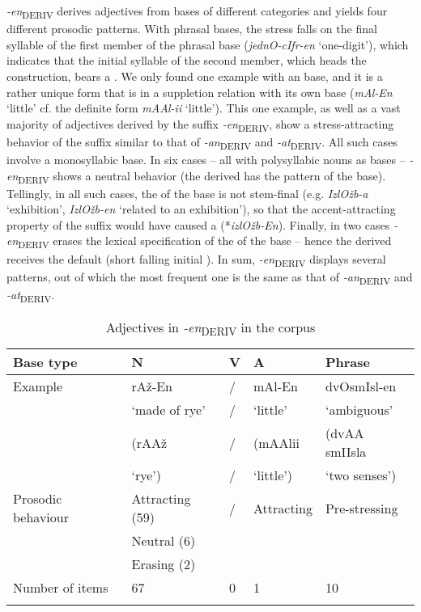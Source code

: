 \documentclass[output=paper, colorlinks, citecolor=brown, newtxmath]{langsci/langscibook}
\begin{document}
\textit{-en}\textsubscript{DERIV} derives adjectives from bases of different categories and yields four different prosodic patterns. With phrasal bases, the stress falls on the final syllable of the first member of the phrasal base (\textit{jednO-cIfr-en} `one-digit'), which indicates that the initial syllable of the second member, which heads the construction, bears a . We only found one example with an  base, and it is a rather unique form that is in a suppletion relation with its own base (\textit{mAl-En} `little' cf. the definite form \textit{mAAl-ii} `little'). This one example, as well as a vast majority of  adjectives derived by the suffix \textit{{-en}}\textsubscript{DERIV}, show a stress-attracting behavior of the suffix similar to that of {\textit{{-an}}}\textsubscript{DERIV} and {\textit{{-at}}}\textsubscript{DERIV}. All such cases involve a monosyllabic base. In six cases – all with polysyllabic nouns as bases – {\textit{{-en}}}\textsubscript{DERIV} shows a neutral behavior (the derived  has the  pattern of the base). Tellingly, in all such cases, the  of the base is not stem-final (e.g. \textit{IzlOžb-a} `exhibition', \textit{IzlOžb-en} `related to an exhibition'), so that the accent-attracting property of the suffix would have caused a  (*\textit{izlOžb-En}). Finally, in two cases {\textit{{-en}}}\textsubscript{DERIV} erases the lexical specification of the  of the base – hence the derived  receives the default  (short falling initial ). In sum, {\textit{{-en}}}\textsubscript{DERIV} displays several patterns, out of which the most frequent one is the same as that of {\textit{{-an}}}\textsubscript{DERIV} and {\textit{{-at}}}\textsubscript{DERIV}.

\begin{table}
\caption{Adjectives in \textit{-en}\textsubscript{DERIV} in the corpus}
\label{tab1_d}
 \begin{tabular}{ l l l l l}
\lsptoprule
 Base type & N & V & A & Phrase\\
\midrule
Example  &  rAž-En & / & mAl-En &  dvOsmIsl-en   \\
& `made of rye' & / & `little' & `ambiguous'  \\
& (rAAž  & / & (mAAlii  & (dvAA smIIsla \\
& `rye') & / & `little') & `two senses')\smallskip\\
Prosodic behaviour & Attracting (59) & / & Attracting & Pre-stressing\\
& Neutral (6)&&&\\
& Erasing (2)\smallskip&&&\\
 Number of items & 67 & 0 & 1 & 10\\
 \lspbottomrule
 \end{tabular}
\end{table}
\end{document}
